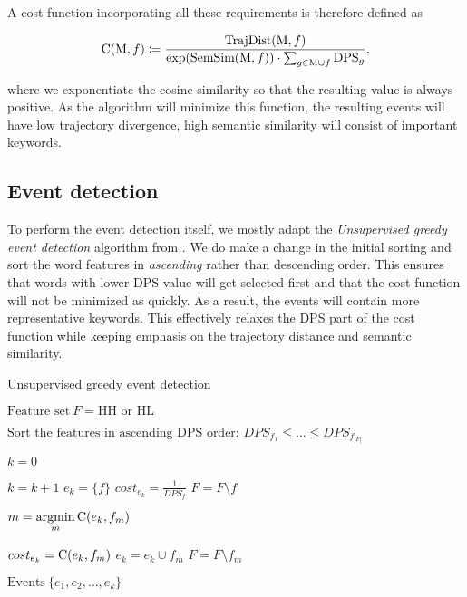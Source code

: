 A cost function incorporating all these requirements is therefore defined as

\begin{equation} \label{eq:cost-function}
	\text{C}( \text{M}, f ) \coloneqq \frac{\text{TrajDist}( \text{M}, f )}{\exp(\text{SemSim}( \text{M}, f )) \cdot \sum_{g \in \text{M} \cup f}{\text{DPS}_{g}}},
\end{equation}

where we exponentiate the cosine similarity so that the resulting value is always positive. As the algorithm will minimize this function, the resulting events will have low trajectory divergence, high semantic similarity will consist of important keywords.


\subsection{Event detection}
To perform the event detection itself, we mostly adapt the \textit{Unsupervised greedy event detection} algorithm from \cite{event-detection}. We do make a change in the initial sorting and sort the word features in \textit{ascending} rather than descending order. This ensures that words with lower DPS value will get selected first and that the cost function will not be minimized as quickly. As a result, the events will contain more representative keywords. This effectively relaxes the DPS part of the cost function while keeping emphasis on the trajectory distance and semantic similarity.

\begin{algorithm}[H]
\begin{algorithmic}[1]
\caption{Unsupervised greedy event detection}
\Input $\text{Feature set} ~ F = \text{HH or HL}$

\State $\text{Sort the features in ascending DPS order: } DPS_{f_{1}} \leq \dots \leq DPS_{f_{\left\vert F \right\vert}}$

\State $k = 0$

	\State $k = k + 1$	
	\State $e_{k} = \{ f \}$
	\State $cost_{e_{k}} = \frac{1}{DPS_{f}}$
	\State $F = F \setminus f$
	
		\State $m = \operatorname*{argmin}\limits_{m}{\text{C}( e_{k}, f_{m} )}$

			\State $cost_{e_{k}} = \text{C}( e_{k}, f_{m} )$
			\State $e_{k} = e_{k} \cup f_{m}$
			\State $F = F \setminus f_{m}$
		\Else
			\Break
		\EndIf
	\EndWhile
\EndFor

\Output $\text{Events} ~ \{ e_{1}, e_{2}, \dots, e_{k} \}$
\end{algorithmic}
\end{algorithm}


